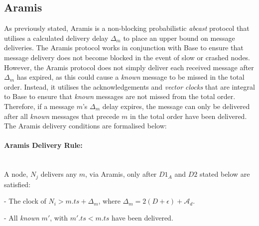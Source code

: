 %    

    \subsection{Aramis}\label{ssec:aramis}
    As previously stated,  \textsf{Aramis} is a non-blocking probabilistic \emph{abcast} protocol that utilises a calculated delivery delay $\Delta_m$ to place an upper bound on message deliveries.  The \textsf{Aramis} protocol works in conjunction with \textsf{Base} to ensure that message delivery does not become blocked in the event of slow or crashed nodes.  However, the \textsf{Aramis} protocol does not simply deliver each received message after $\Delta_m$ has expired, as this could cause a \emph{known} message to be missed in the total order.  Instead, it utilises the acknowledgements and \emph{vector clocks} that are integral to \textsf{Base} to ensure that \emph{known} messages are not missed from the total order.  Therefore, if a message $m$'s $\Delta_m$ delay expires, the message can only be delivered after all \emph{known} messages that precede $m$ in the total order have been delivered.  The \textsf{Aramis} delivery conditions are formalised below:
    
    \paragraph{\textsf{Aramis} Delivery Rule:}\hspace{0pt} \\
        A node, $N_j$ delivers any $m$, via \textsf{Aramis}, only after $D1_A$ and $D2$ stated below are satisfied:
        \begin{description}[labelindent=1cm]
            \item[$\boldsymbol{D1_A}$] - The clock of $N_i > m.ts + \Delta_{m}$, where $\Delta_{m} = 2(D + \epsilon) + \mathcal{A}_d$.
            
            \item[$\boldsymbol{D2}$] - All \emph{known} $m'$, with $m'.ts < m.ts$ have been delivered.
        \end{description}
    
